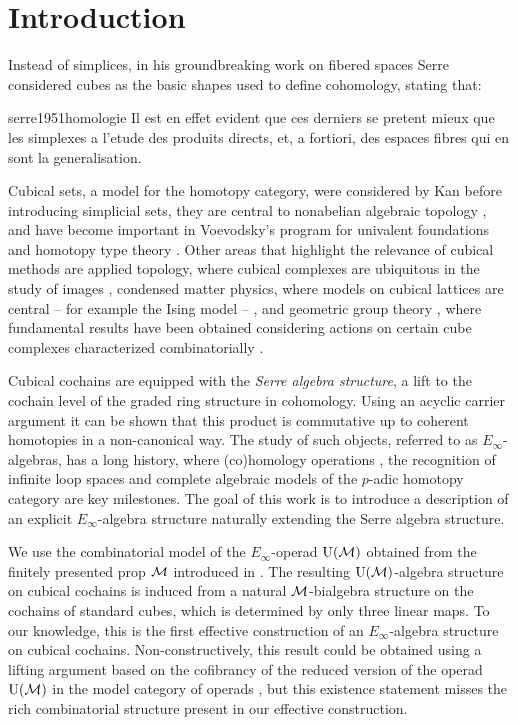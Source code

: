 
\section{Introduction} \label{s:introduction}

Instead of simplices, in his groundbreaking work on fibered spaces Serre considered cubes as the basic shapes used to define cohomology, stating that:
\begin{displaycquote}[p.431]{serre1951homologie}
	Il est en effet evident que ces derniers se pretent mieux que les simplexes a l'etude des produits directs, et, a fortiori, des espaces fibres qui en sont la generalisation.
\end{displaycquote}
Cubical sets, a model for the homotopy category, were considered by Kan \cite{kan1955abstract, kan1956abstract} before introducing simplicial sets, they are central to nonabelian algebraic topology \cite{brown2011nonabelian}, and have become important in Voevodsky's program for univalent foundations and homotopy type theory \cite{kapulkin2020straightening, mortberg2017cubical}.
Other areas that highlight the relevance of cubical methods are applied topology, where cubical complexes are ubiquitous in the study of images \cite{tomasz2004computational}, condensed matter physics, where models on cubical lattices are central -- for example the Ising model -- \cite{baxter1985exactlysolved}, and geometric group theory \cite{gromov1987hyperbolic}, where fundamental results have been obtained considering actions on certain cube complexes characterized combinatorially \cite{agol2013haken}.

Cubical cochains are equipped with the \textit{Serre algebra structure}, a lift to the cochain level of the graded ring structure in cohomology.
Using an acyclic carrier argument it can be shown that this product is commutative up to coherent homotopies in a non-canonical way.
The study of such objects, referred to as $E_\infty$-algebras, has a long history, where (co)homology operations \cite{steenrod1962cohomology, may1970general}, the recognition of infinite loop spaces \cite{boardman1973homotopy, may1972geometry} and complete algebraic models of the $p$-adic homotopy category \cite{mandell2001padic} are key milestones.
The goal of this work is to introduce a description of an explicit $E_\infty$-algebra structure naturally extending the Serre algebra structure.

We use the combinatorial model of the $E_\infty$-operad ${\operatorname{U}(\mathcal{M})}$ obtained from the finitely presented prop $\mathcal{M}$ introduced in \cite{medina2020prop1}.
The resulting ${\operatorname{U}(\mathcal{M})}$-algebra structure on cubical cochains is induced from a natural $\mathcal{M}$-bialgebra structure on the cochains of standard cubes, which is determined by only three linear maps.
To our knowledge, this is the first effective construction of an $E_\infty$-algebra structure on cubical cochains.
Non-constructively, this result could be obtained using a lifting argument based on the cofibrancy of the reduced version of the operad ${\operatorname{U}(\mathcal{M})}$ in the model category of operads \cite{hinich1997homological, berger2003modelcategory}, but this existence statement misses the rich combinatorial structure present in our effective construction.


